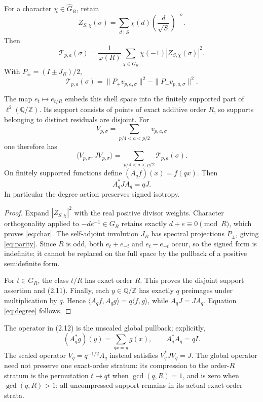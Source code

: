 \begin{proposition}
For a character $\chi\in\widehat G_R$, retain
\[
 Z_{S,\chi}(\sigma)=
 \sum_{d\mid S}\chi(d)\left(\frac d{\sqrt S}\right)^{-\sigma}.
\]
Then
\[
 \boxed{\mathcal T_{p,a}(\sigma)=
 \frac1{\varphi(R)}\sum_{\chi\in\widehat G_R}
 \chi(-1)|Z_{S,\chi}(\sigma)|^2.}                               \tag{2.9}\label{eq:char}
\]
With $P_\pm=(I\pm J_R)/2$,
\[
 \boxed{\mathcal T_{p,a}(\sigma)=
 \|P_+v_{p,a,\sigma}\|^2-\|P_-v_{p,a,\sigma}\|^2.}            \tag{2.10}\label{eq:parity}
\]

The map $e_t\mapsto e_{t/R}$ embeds this shell space into the finitely supported
part of $\ell^2(\mathbb Q/\mathbb Z)$.  Its support consists of points of exact
additive order $R$, so supports belonging to distinct residuals are disjoint.
For
\[
 V_{p,\sigma}=\sum_{p/4<a<p/2}v_{p,a,\sigma}
\]
one therefore has
\[
 \langle V_{p,\sigma},JV_{p,\sigma}\rangle
 =\sum_{p/4<a<p/2}\mathcal T_{p,a}(\sigma).                       \tag{2.11}
\]
On finitely supported functions define $(A_qf)(x)=f(qx)$.  Then
\[
 \boxed{A_q^*JA_q=qJ.}                                           \tag{2.12}\label{eq:degree}
\]
In particular the degree action preserves signed isotropy.
\end{proposition}

\begin{proof}
Expand $|Z_{S,\chi}|^2$ with the real positive divisor weights.  Character
orthogonality applied to $-de^{-1}\in G_R$ retains exactly $d+e\equiv0\pmod R$,
which proves \eqref{eq:char}.  The self-adjoint involution $J_R$ has spectral
projections $P_\pm$, giving \eqref{eq:parity}.  Since $R$ is odd, both
$e_t+e_{-t}$ and $e_t-e_{-t}$ occur, so the signed form is indefinite; it cannot
be replaced on the full space by the pullback of a positive semidefinite form.

For $t\in G_R$, the class $t/R$ has exact order $R$.  This proves the disjoint
support assertion and (2.11).  Finally, each $y\in\mathbb Q/\mathbb Z$ has
exactly $q$ preimages under multiplication by $q$.  Hence
$\langle A_qf,A_qg\rangle=q\langle f,g\rangle$, while $A_qJ=JA_q$.
Equation \eqref{eq:degree} follows.
\end{proof}

The operator in (2.12) is the unscaled global pullback; explicitly,
\[
 (A_q^*g)(y)=\sum_{qx=y}g(x),\qquad A_q^*A_q=qI.                 \tag{2.13}
\]
The scaled operator $V_q=q^{-1/2}A_q$ instead satisfies $V_q^*JV_q=J$.  The global
operator need not preserve one exact-order stratum: its compression to the
order-$R$ stratum is the permutation $t\mapsto qt$ when $\gcd(q,R)=1$, and is
zero when $\gcd(q,R)>1$; all uncompressed support remains in its actual
exact-order strata.

